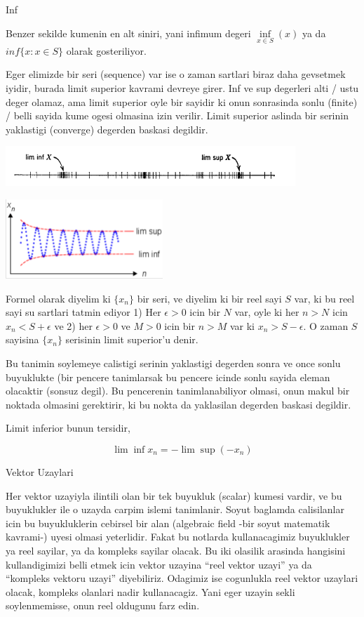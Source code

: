 \documentclass[12pt,fleqn]{article}\usepackage{../common}
\begin{document}
Inf

Benzer sekilde kumenin en alt siniri, yani infimum degeri $\inf\limits_{x
  \in S}(x)$ ya 
da $inf\{x:x \in
S\}$ olarak gosteriliyor. 

Eger elimizde bir seri (sequence) var ise o zaman sartlari biraz daha
gevsetmek iyidir, burada limit superior kavrami devreye girer. Inf ve sup
degerleri alti / ustu deger olamaz, ama limit superior oyle bir sayidir ki
onun sonrasinda sonlu (finite) / belli sayida kume ogesi olmasina izin
verilir. Limit superior aslinda bir serinin yaklastigi (converge) degerden
baskasi degildir. 

\includegraphics[height=1.5cm]{2_1.png}

\includegraphics[height=3cm]{2_2.png}

Formel olarak diyelim ki $\{x_n\}$ bir seri, ve diyelim ki bir reel
sayi $S$ var, ki bu reel sayi su sartlari tatmin ediyor 
1) Her $\epsilon > 0$ icin bir $N$ var, oyle ki her $n>N$ icin $x_n
< S + \epsilon$ 
ve 2) her $\epsilon > 0$ ve $M>0$ icin bir  $n>M$ var ki $x_n
> S - \epsilon$. O 
zaman $S$ sayisina  $\{x_n\}$ serisinin limit superior'u denir. 

Bu tanimin soylemeye calistigi serinin yaklastigi degerden sonra ve once
sonlu buyuklukte (bir pencere tanimlarsak bu pencere icinde sonlu sayida
eleman olacaktir (sonsuz degil). Bu pencerenin tanimlanabiliyor olmasi,
onun makul bir noktada olmasini gerektirir, ki bu nokta da yaklasilan
degerden baskasi degildir. 

Limit inferior bunun tersidir, 

\[ \lim \inf x_n  = -\lim \sup(-x_n)\]

Vektor Uzaylari 

Her vektor uzayiyla ilintili olan bir tek buyukluk (scalar) kumesi vardir,
ve bu buyuklukler ile o uzayda carpim islemi tanimlanir. Soyut baglamda
calisilanlar icin bu buyukluklerin cebirsel bir alan (algebraic field -bir
soyut matematik kavrami-) uyesi olmasi yeterlidir. Fakat bu notlarda
kullanacagimiz buyuklukler ya reel sayilar, ya da kompleks sayilar
olacak. Bu iki olasilik arasinda hangisini kullandigimizi belli etmek icin
vektor uzayina ``reel vektor uzayi'' ya da ``kompleks vektoru uzayi''
diyebiliriz. Odagimiz ise cogunlukla reel vektor uzaylari olacak, kompleks
olanlari nadir kullanacagiz. Yani eger uzayin sekli soylenmemisse, onun
reel oldugunu farz edin. 
\end{document}
